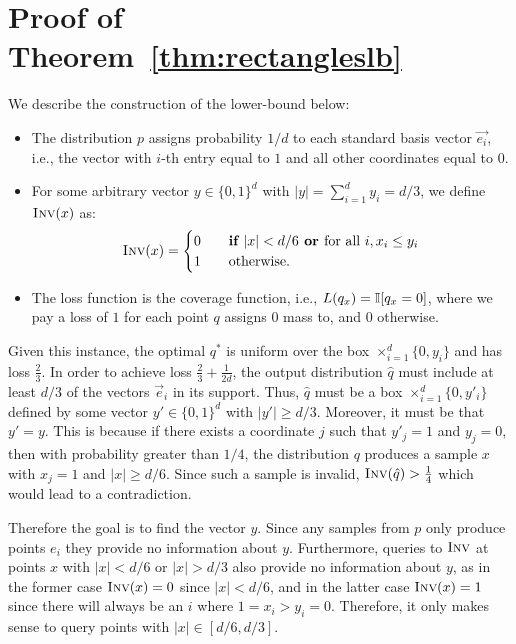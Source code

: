 \section{Proof of Theorem~\ref{thm:rectangleslb}}
\label{sec:proper-lb-proof}
  We describe the construction of the lower-bound below:
  \begin{itemize}
  \item The distribution $p$ assigns probability $1/d$ to each standard basis vector $\vec {e_i}$, i.e., the vector with $i$-th entry equal to $1$ and all other coordinates equal to $0$.
  \item For some arbitrary vector $y \in \{0,1\}^d$ with $|y| = \sum_{i=1}^d y_i = d/3$, we define $\textsc{Inv}(x)$ as: $$\textsc{Inv}(x) = \begin{cases}
       0 &\quad\textbf{if } |x| < d/6 \textbf{ or } \text{for all } i, x_i \le y_i\\
       1 &\quad\text{otherwise.} \\ 
     \end{cases}$$
  \item The loss function is the coverage function, i.e., $L(q_x) = \mathbb{I}[ q_x = 0 ]$, where we pay a loss of $1$ for each point $q$ assigns $0$ mass to, and $0$ otherwise.
\end{itemize}

Given this instance, the optimal $q^*$ is uniform over the box $\times_{i=1}^d \{0,y_i\}$ and has loss $\frac 2 3$. In order to achieve loss $\frac 23 + \frac 1 {2d}$, the output distribution $\hat q$ must include at least $d/3$ of the vectors $\vec e_i$ in its support. Thus, $\hat q$ must be a box $\times_{i=1}^d \{0,y'_i\}$ defined by some vector $y' \in \{0,1\}^d$ with 
$|y'| \ge d/3$. Moreover, it must be that $y' = y$. This is because if there exists a coordinate $j$ such that $y'_j=1$ and $y_j=0$, then with probability greater than $1/4$, the distribution $q$ produces a sample $x$ with $x_j=1$ and $|x| \ge d/6$. Since such a sample is invalid, $\textsc{Inv}(\hat q) > \frac 14$ which would lead to a contradiction.

Therefore the goal is to find the vector $y$. 
Since any samples from $p$ only produce points $e_i$ they provide no information about $y$.
Furthermore, queries to $\textsc{Inv}$ at points $x$ with $|x| < d/6$ or $|x| > d/3$ also provide no information about $y$, as in the former case $\textsc{Inv}(x) = 0$ since $|x| < d/6$, and in the latter case $\textsc{Inv}(x) = 1$ since there will always be an $i$ where $1 = x_i > y_i = 0$. 
Therefore, it only makes sense to query points with $|x| \in [d/6,d/3]$.

